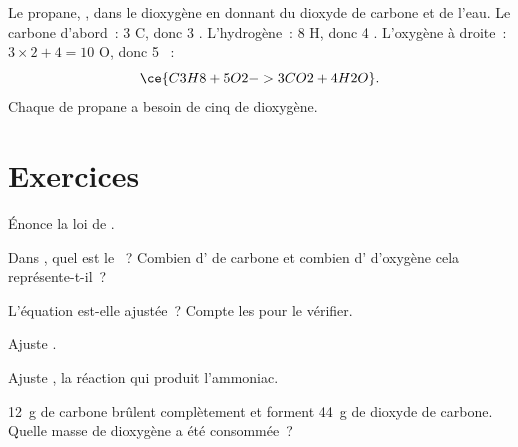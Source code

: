 \begin{example}\label{ex:g8:balanced-equations:propane}
Le propane, ,  dans le dioxygène en donnant du dioxyde de
carbone et de l'eau. Le carbone d'abord~: 3 C, donc 3 .
L'hydrogène~: 8 H, donc 4 . L'oxygène à droite~:
$3 \times 2 + 4 = 10$ O, donc 5 ~:
\[
  \ce{C3H8 + 5O2 -> 3CO2 + 4H2O}.
\]
Chaque  de propane a besoin de cinq  de dioxygène.
\end{example}

\section{Exercices}

\begin{exercise}[$\star$]\label{exo:g8:balanced-equations:1}
Énonce la loi de .
\end{exercise}

\begin{exercise}[$\star$]\label{exo:g8:balanced-equations:2}
Dans , quel est le ~? Combien
d' de carbone et combien d' d'oxygène cela représente-t-il~?
\end{exercise}

\begin{exercise}[$\star$]\label{exo:g8:balanced-equations:3}
L'équation  est-elle ajustée~? Compte les  pour
le vérifier.
\end{exercise}

\begin{exercise}[$\star$]\label{exo:g8:balanced-equations:4}
Ajuste . %
\end{exercise}

\begin{exercise}[$\star\star$]\label{exo:g8:balanced-equations:5}
Ajuste , la réaction qui produit l'ammoniac. %
\end{exercise}

\begin{exercise}[$\star\star$]\label{exo:g8:balanced-equations:6}
\qty{12}{g} de carbone brûlent complètement et forment \qty{44}{g} de
dioxyde de carbone. Quelle masse de dioxygène a été consommée~?
\end{exercise}

